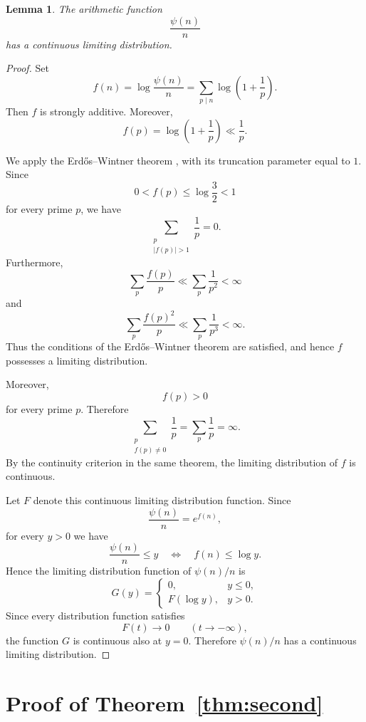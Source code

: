 \documentclass{article}
\newtheorem{lemma}{Lemma}
\begin{document}
\begin{lemma}\label{lem:continuous-distribution}
The arithmetic function
\[
\frac{\psi(n)}n
\]
has a continuous limiting distribution.
\end{lemma}

\begin{proof}
Set
\[
f(n)
=
\log\frac{\psi(n)}n
=
\sum_{p\mid n}\log\left(1+\frac1p\right).
\]
Then $f$ is strongly additive. Moreover,
\[
f(p)
=
\log\left(1+\frac1p\right)
\ll
\frac1p.
\]

We apply the Erd\H{o}s--Wintner theorem
\cite[Chapter~III.4, Theorem~1]{ref13},
with its truncation parameter equal to $1$.
Since
\[
0<f(p)\le\log\frac32<1
\]
for every prime $p$, we have
\[
\sum_{\substack{p\\|f(p)|>1}}\frac1p=0.
\]
Furthermore,
\[
\sum_p\frac{f(p)}p
\ll
\sum_p\frac1{p^2}
<\infty
\]
and
\[
\sum_p\frac{f(p)^2}{p}
\ll
\sum_p\frac1{p^3}
<\infty.
\]
Thus the conditions of the Erd\H{o}s--Wintner theorem are satisfied,
and hence $f$ possesses a limiting distribution.

Moreover,
\[
f(p)>0
\]
for every prime $p$. Therefore
\[
\sum_{\substack{p\\f(p)\ne0}}\frac1p
=
\sum_p\frac1p
=
\infty.
\]
By the continuity criterion in the same theorem, the limiting
distribution of $f$ is continuous.

Let $F$ denote this continuous limiting distribution function.
Since
\[
\frac{\psi(n)}n=e^{f(n)},
\]
for every $y>0$ we have
\[
\frac{\psi(n)}n\le y
\quad\Longleftrightarrow\quad
f(n)\le\log y.
\]
Hence the limiting distribution function of $\psi(n)/n$ is
\[
G(y)
=
\begin{cases}
0, & y\le0,\\[3pt]
F(\log y), & y>0.
\end{cases}
\]
Since every distribution function satisfies
\[
F(t)\longrightarrow0
\qquad(t\to-\infty),
\]
the function $G$ is continuous also at $y=0$. Therefore
$\psi(n)/n$ has a continuous limiting distribution.
\end{proof}


\section{Proof of Theorem~\ref{thm:second}}
\end{document}
